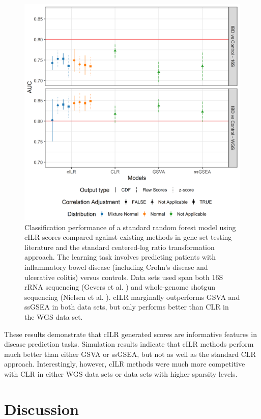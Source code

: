 \documentclass{article}
\begin{document}
\begin{figure}[H]
    \centering
    \includegraphics[scale = 0.6]{figures/data_prediction_plot.png}
    \caption{Classification performance of a standard random forest model using cILR scores compared against existing methods in gene set testing literature and the standard centered-log ratio transformation approach. The learning task involves predicting patients with inflammatory bowel disease (including Crohn's disease and ulcerative colitis) versus controls. Data sets used span both 16S rRNA sequencing (Gevers et al. \cite{gevers2014}) and whole-genome shotgun sequencing (Nielsen et al. \cite{nielsen2014}). cILR marginally outperforms GSVA and ssGSEA in both data sets, but only performs better than CLR in the WGS data set.}
    \label{fig:pred_data}
\end{figure}

These results demonstrate that cILR generated scores are informative features in disease prediction tasks. Simulation results indicate that cILR methods perform much better than either GSVA or ssGSEA, but not as well as the standard CLR approach. Interestingly, however, cILR methods were much more competitive with CLR in either WGS data sets or data sets with higher sparsity levels. 


\section*{Discussion}
\end{document}
